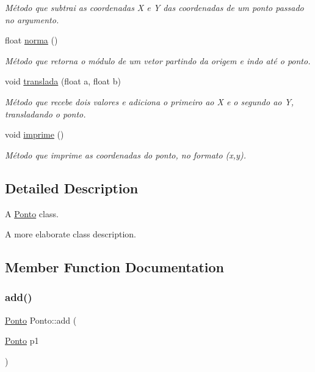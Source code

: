 \begin{DoxyCompactItemize}
\begin{DoxyCompactList}\small\item\em Método que subtrai as coordenadas X e Y das coordenadas de um ponto passado no argumento. \end{DoxyCompactList}\item 
float \mbox{\hyperlink{classPonto_a9b0ddbdddd05edbc4d45ef0671a628c6}{norma}} ()
\begin{DoxyCompactList}\small\item\em Método que retorna o módulo de um vetor partindo da origem e indo até o ponto. \end{DoxyCompactList}\item 
void \mbox{\hyperlink{classPonto_a96a4395204ec010814e67d20705e630f}{translada}} (float a, float b)
\begin{DoxyCompactList}\small\item\em Método que recebe dois valores e adiciona o primeiro ao X e o segundo ao Y, transladando o ponto. \end{DoxyCompactList}\item 
\mbox{\label{classPonto_a84758d453e38f237bdf860b6435e9def}} 
void \mbox{\hyperlink{classPonto_a84758d453e38f237bdf860b6435e9def}{imprime}} ()
\begin{DoxyCompactList}\small\item\em Método que imprime as coordenadas do ponto, no formato (x,y). \end{DoxyCompactList}\end{DoxyCompactItemize}


\subsection{Detailed Description}
A \mbox{\hyperlink{classPonto}{Ponto}} class. 

A more elaborate class description. 

\subsection{Member Function Documentation}
\mbox{\label{classPonto_abb68d6122278de262e8ed1c70714e3d9}} 
\subsubsection{\texorpdfstring{add()}{add()}}
{\footnotesize\ttfamily \mbox{\hyperlink{classPonto}{Ponto}} Ponto\+::add (\begin{DoxyParamCaption}\item[{\mbox{\hyperlink{classPonto}{Ponto}}}]{p1 }\end{DoxyParamCaption})\hspace{0.3cm}{\ttfamily [inline]}}



